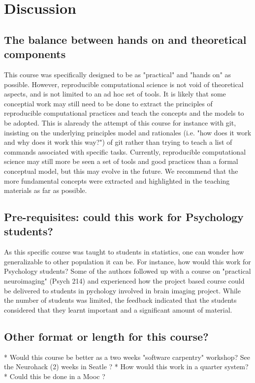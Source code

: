\section{Discussion}\label{discussion}

\subsection*{The balance between hands on and theoretical components}
This course was specifically designed to be as "practical" and "hands on" as possible. However, reproducible computational science is not void of theoretical aspects, and is not limited to an ad hoc set of tools. It is likely that some conceptial work may still need to be done to extract the principles of reproducible computational practices and teach the concepts and the models to be adopted. This is alaready the attempt of this course for instance with git, insisting on the underlying principles model and rationales (i.e. "how does it work and why does it work this way?") of git rather than trying to teach a list of commands associated with specific tasks. Currently, reproducible computational science may still more be seen a set of tools and good practices than a formal conceptual model, but this may evolve in the future. We recommend that the more fundamental concepts were extracted and highlighted in the teaching materials as far as possible. 

\subsection*{Pre-requisites: could this work for Psychology students?}
As this specific course was taught to students in statistics, one can wonder how generalizable to other population it can be. For instance, how would this work for Psychology students? Some of the authors followed up with a course on "practical neuroimaging" (Psych 214) and experienced how the project based course could be delivered to students in pychology involved in brain imaging project. While the number of students was limited, the feedback indicated that the students considered that they learnt important and a significant amount of material.

\subsection*{Other format or length for this course?}
* Would this course be better as a two weeks "software carpentry" workshop? See the Neurohack (2) weeks in Seatle ?
* How would this work in a quarter system?
* Could this be done in a Mooc ? 

